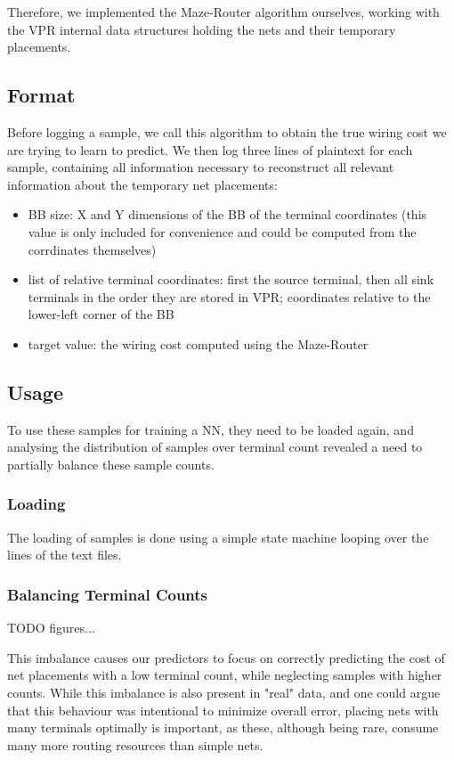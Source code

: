 Therefore, we implemented the Maze-Router algorithm ourselves, working with the \gls{VPR} internal data structures holding the nets and their temporary placements.

\subsection{Format}

Before logging a sample, we call this algorithm to obtain the true wiring cost we are trying to learn to predict. We then log three lines of plaintext for each sample, containing all information necessary to reconstruct all relevant information about the temporary net placements:

\begin{itemize}
	\item \gls{BB} size: X and Y dimensions of the \gls{BB} of the terminal coordinates (this value is only included for convenience and could be computed from the corrdinates themselves)
	\item list of relative terminal coordinates: first the source terminal, then all sink terminals in the order they are stored in \gls{VPR}; coordinates relative to the lower-left corner of the \gls{BB}
	\item target value: the wiring cost computed using the Maze-Router
\end{itemize}

\subsection{Usage}

To use these samples for training a \gls{NN}, they need to be loaded again, and analysing the distribution of samples over terminal count revealed a need to partially balance these sample counts.

\subsubsection{Loading}

The loading of samples is done using a simple state machine looping over the lines of the text files.

\subsubsection{Balancing Terminal Counts}

TODO figures...

This imbalance causes our predictors \cite{TODO only lstms} to focus on correctly predicting the cost of net placements with a low terminal count, while neglecting samples with higher counts. While this imbalance is also present in "real" data, and one could argue that this behaviour was intentional to minimize overall error, placing nets with many terminals optimally is important, as these, although being rare, consume many more routing resources than simple nets.

